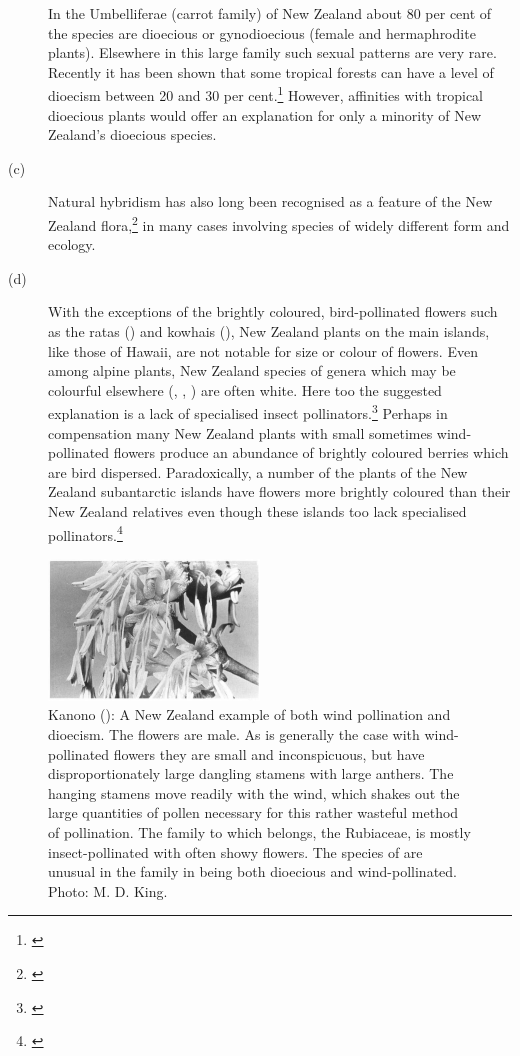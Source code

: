 \begin{description}
In the Umbelliferae (carrot family) of New Zealand about 80 per cent of the species are dioecious or gynodioecious (female and hermaphrodite plants).
Elsewhere in this large family such sexual patterns are very rare.
Recently it has been shown that some tropical forests can have a level of dioecism between 20 and 30 per cent.\footnote{\cite{bawa1979breeding}}
However, affinities with tropical dioecious plants would offer an explanation for only a minority of New Zealand's dioecious species.
\item[{(c)}]Natural hybridism has also long been recognised as a feature of  the New Zealand flora,\footnote{\cite{connor1985biosystematics}} in many cases involving species of widely different form and ecology.
\item[{(d)}]With the exceptions of the brightly coloured, bird-pollinated flowers such as the ratas () and kowhais (), New Zealand plants on the main islands, like those of Hawai{\okina}i, are not notable for size or colour of flowers.
Even among alpine plants, New Zealand species of genera which may be colourful elsewhere (, , ) are often white.
Here too the suggested explanation is a lack of specialised insect pollinators.\footnote{\cite{primack1983insect}} Perhaps in compensation many New Zealand plants with small sometimes wind-pollinated flowers produce an abundance of brightly coloured berries which are bird dispersed.
Paradoxically, a number of the plants of the New Zealand subantarctic islands have flowers more brightly coloured than their New Zealand relatives even though these islands too lack specialised pollinators.\footnote{\cite{godley1979flower}}
\end{description}

\begin{figure}
	\includegraphics[width=0.5\textwidth]{graphics/figure5kanono.jpg}
	\centering
	\caption[Kanono: A New Zealand example of both wind pollination and dioecism]{Kanono (): A New Zealand example of both wind pollination and dioecism.
	The flowers are male.
	As is generally the case with wind-pollinated flowers they are small and inconspicuous, but have disproportionately large dangling stamens with large anthers.
	The hanging stamens move readily with the wind, which shakes out the large quantities of pollen necessary for this rather wasteful method of pollination.
	The family to which  belongs, the Rubiaceae, is mostly insect-pollinated with often showy flowers.
	The species of  are unusual in the family in being both dioecious and wind-pollinated.
	Photo: M. D. King.}%
	\label{fig:5kanono}
\end{figure}

